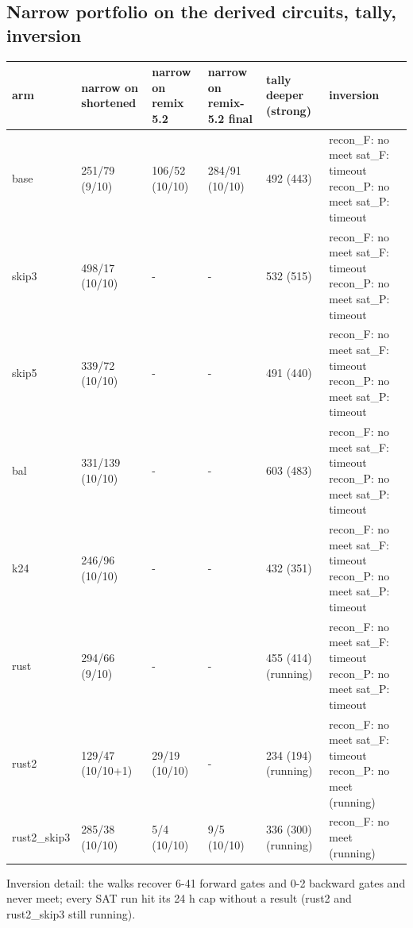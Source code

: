 \documentclass[10pt,a4paper]{article}
\begin{document}
\subsection{Narrow portfolio on the derived circuits, tally, inversion}

{\small\setlength{\tabcolsep}{2pt}\begin{longtable}{|p{1.57cm}|p{2.18cm}|p{2.18cm}|p{2.57cm}|p{2.32cm}|p{4.48cm}|}\hline
\textbf{arm} & \textbf{narrow on shortened} & \textbf{narrow on remix 5.2} & \textbf{narrow on remix-5.2 final} & \textbf{tally deeper (strong)} & \textbf{inversion}\\\hline\endhead
base & 251/\allowbreak{}79 (9/\allowbreak{}10) & 106/\allowbreak{}52 (10/\allowbreak{}10) & 284/\allowbreak{}91 (10/\allowbreak{}10) & 492 (443) & recon\_F: no meet sat\_F: timeout recon\_P: no meet sat\_P: timeout\\\hline
skip3 & 498/\allowbreak{}17 (10/\allowbreak{}10) & - & - & 532 (515) & recon\_F: no meet sat\_F: timeout recon\_P: no meet sat\_P: timeout\\\hline
skip5 & 339/\allowbreak{}72 (10/\allowbreak{}10) & - & - & 491 (440) & recon\_F: no meet sat\_F: timeout recon\_P: no meet sat\_P: timeout\\\hline
bal & 331/\allowbreak{}139 (10/\allowbreak{}10) & - & - & 603 (483) & recon\_F: no meet sat\_F: timeout recon\_P: no meet sat\_P: timeout\\\hline
k24 & 246/\allowbreak{}96 (10/\allowbreak{}10) & - & - & 432 (351) & recon\_F: no meet sat\_F: timeout recon\_P: no meet sat\_P: timeout\\\hline
rust & 294/\allowbreak{}66 (9/\allowbreak{}10) & - & - & 455 (414) (running) & recon\_F: no meet sat\_F: timeout recon\_P: no meet sat\_P: timeout\\\hline
rust2 & 129/\allowbreak{}47 (10/\allowbreak{}10+1) & 29/\allowbreak{}19 (10/\allowbreak{}10) & - & 234 (194) (running) & recon\_F: no meet sat\_F: timeout recon\_P: no meet (running)\\\hline
rust2\_skip3 & 285/\allowbreak{}38 (10/\allowbreak{}10) & 5/\allowbreak{}4 (10/\allowbreak{}10) & 9/\allowbreak{}5 (10/\allowbreak{}10) & 336 (300) (running) & recon\_F: no meet (running)\\\hline
\end{longtable}}

Inversion detail: the walks recover 6-41 forward gates and 0-2 backward gates and never meet; every SAT run hit its 24 h cap without a result (rust2 and rust2\_skip3 still running).
\end{document}
